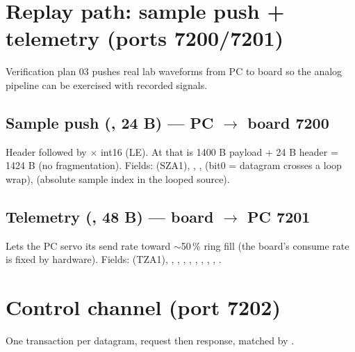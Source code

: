 \section{Replay path: sample push + telemetry (ports 7200/7201)}

Verification plan 03 pushes real lab waveforms from PC to board so the analog
pipeline can be exercised with recorded signals.

\subsection{Sample push (, 24 B) --- PC $\to$ board 7200}
Header followed by  $\times$ int16 (LE). At
 that is 1400 B payload + 24 B header
= 1424 B (no fragmentation). Fields: (SZA1), ,
,  (bit0 = datagram crosses a loop wrap),
 (absolute sample index in the looped source).

\subsection{Telemetry (, 48 B) --- board $\to$ PC 7201}
Lets the PC servo its send rate toward $\sim$50\,\% ring fill (the board's
consume rate is fixed by hardware). Fields: (TZA1), ,
, , ,
, , ,
, .

\section{Control channel (port 7202)}
\label{sec:control}

One transaction per datagram, request then response, matched by .

